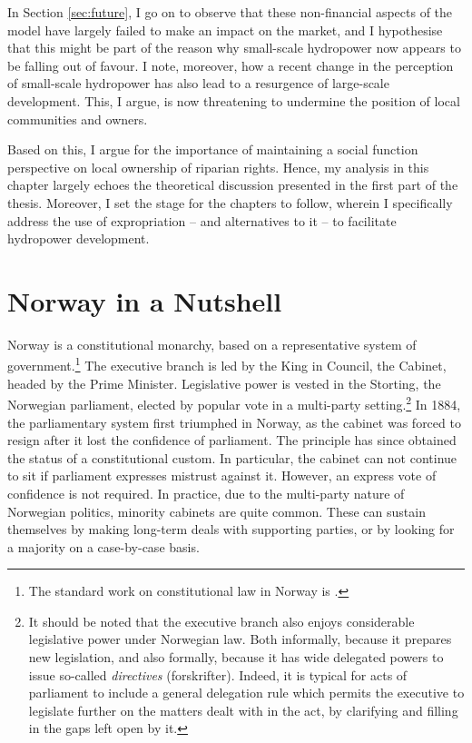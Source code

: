 In Section \ref{sec:future}, I go on to observe that these non-financial aspects of the model have largely failed to make an impact on the market, and I hypothesise that this might be part of the reason why small-scale hydropower now appears to be falling out of favour. I note, moreover, how a recent change in the perception of small-scale hydropower has also lead to a resurgence of large-scale development. This, I argue, is now threatening to undermine the position of local communities and owners.

Based on this, I argue for the importance of maintaining a social function perspective on local ownership of riparian rights. Hence, my analysis in this chapter largely echoes the theoretical discussion presented in the first part of the thesis. Moreover, I set the stage for the chapters to follow, wherein I specifically address the use of expropriation -- and alternatives to it --  to facilitate hydropower development.

\section{Norway in a Nutshell}\label{sec:nutshell}

Norway is a constitutional monarchy, based on a representative system of government.\footnote{The standard work on constitutional law in Norway is \cite{andenes06}.} The executive branch is led by the King in Council, the Cabinet, headed by the Prime Minister. Legislative power is vested in the Storting, the Norwegian parliament, elected by popular vote in a multi-party setting.\footnote{It should be noted that the executive branch also enjoys considerable legislative power under Norwegian law. Both informally, because it prepares new legislation, and also formally, because it has wide delegated powers to issue so-called {\it directives} (forskrifter). Indeed, it is typical for acts of parliament to include a general delegation rule which permits the executive to legislate further on the matters dealt with in the act, by clarifying and filling in the gaps left open by it.} In 1884, the parliamentary system first triumphed in Norway, as the cabinet was forced to resign after it lost the confidence of parliament. The principle has since obtained the status of a constitutional custom. In particular, the cabinet can not continue to sit if parliament expresses mistrust against it. However, an express vote of confidence is not required. In practice, due to the multi-party nature of Norwegian politics, minority cabinets are quite common. These can sustain themselves by making long-term deals with supporting parties, or by looking for a majority on a case-by-case basis.

